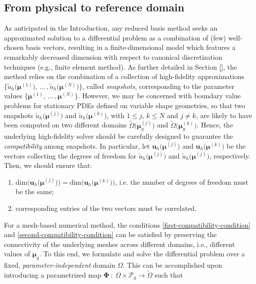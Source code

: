 \documentclass{elsarticle}
\theoremstyle{theorem}
\theoremstyle{definition}
\theoremstyle{remark}
\theoremstyle{proposition}
\numberwithin{figure}{section}
\newcommand{\wt}[1]{\widetilde{#1}}
\newcommand{\bg}[1]{\boldsymbol{#1}}
\begin{document}
	\subsection{From physical to reference domain}
	\label{section:From physical to reference domain}
	
		As anticipated in the Introduction, any reduced basis method seeks an approximated solution to a differential problem as a combination of (few) well-chosen basis vectors, resulting in a finite-dimensional model which features a remarkably decreased dimension with respect to canonical discretization techniques (e.g., finite element method). As further detailed in Section \ref{}, the method relies on the combination of a collection of high-fidelity approximations $\big\lbrace \wt{u}_h \big( \bg{\mu}^{(1)} \big), \, \ldots \, , \wt{u}_h \big( \bg{\mu}^{(N)} \big) \big\rbrace$, called \emph{snapshots}, corresponding to the parameter values $\big\lbrace \bg{\mu}^{(1)}, \, \ldots \, , \bg{\mu}^{(N)} \big\rbrace$. However, we may be concerned with boundary value problems for stationary PDEs defined on variable shape geometries, so that two snapshots $\wt{u}_h \big( \bg{\mu}^{(j)} \big)$ and $\wt{u}_h \big( \bg{\mu}^{(k)} \big)$, with $1 \leq j, \, k \leq N$ and $j \neq k$, are likely to have been computed on two different domains $\wt{\Omega}\big( \bg{\mu}_g^{(j)}\big)$ and $\wt{\Omega}\big( \bg{\mu}_g^{(k)}\big)$. Hence, the underlying high-fidelity solver should be carefully designed to guarantee the \emph{compatibility} among snapshots. In particular, let $\mathbf{u}_h\big( \bg{\mu}^{(j)} \big)$ and $\mathbf{u}_h\big( \bg{\mu}^{(k)} \big) $ be the vectors collecting the degrees of freedom for $\wt{u}_h \big( \bg{\mu}^{(j)} \big)$ and $\wt{u}_h \big( \bg{\mu}^{(j)} \big)$, respectively. Then, we should ensure that:		
		\begin{enumerate}[label=(\alph*)]
			\item $\text{dim} \big( \mathbf{u}_h \big( \bg{\mu}^{(j)} \big) \big) = \text{dim} \big( \mathbf{u}_h \big( \bg{\mu}^{(k)} \big) \big)$, i.e. the number of degrees of freedom must be the same;
			\label{first-compatibility-condition}
			\item corresponding entries of the two vectors must be correlated.
			\label{second-compatibility-condition}
		\end{enumerate}	
		For a mesh-based numerical method, the conditions \ref{first-compatibility-condition} and \ref{second-compatibility-condition} can be satisfied by preserving the connectivity of the underlying meshes across different domains, i.e., different values of $\bg{\mu}_g$. To this end, we formulate and solve the differential problem over a fixed, \emph{parameter-independent} domain $\Omega$. This can be accomplished upon introducing a parametrized map $\bg{\Phi} ~ : ~ \Omega \times \mathcal{P}_g \rightarrow \wt{\Omega}$ such that
\end{document}

